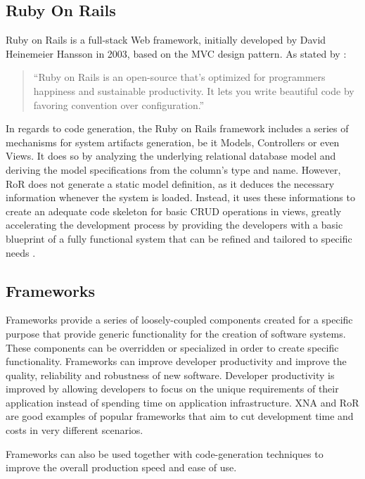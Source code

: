 \subsection{Ruby On Rails}\label{sec:ror}

Ruby on Rails is a full-stack Web framework, initially developed by David Heinemeier Hansson in 2003, based on the MVC design pattern. As stated by \cite{rubyonrails}:

\begin{quote}
  ``Ruby on Rails is an open-source that's optimized for programmers happiness and sustainable productivity. It lets you write beautiful code by favoring convention over configuration.''
\end{quote}

In regards to code generation, the Ruby on Rails framework includes a series of mechanisms for system artifacts generation, be it Models, Controllers or even Views. It does so by analyzing the underlying relational database model and deriving the model specifications from the column's type and name. However, RoR does not generate a static model definition, as it deduces the necessary information whenever the system is loaded. Instead, it uses these informations to create an adequate code skeleton for basic CRUD operations in views, greatly accelerating the development process by providing the developers with a basic blueprint of a fully functional system that can be refined and tailored to specific needs \cite{rails_generators}.

\subsection{Frameworks}\label{sec:frameworks}

Frameworks provide a series of loosely-coupled components created for a specific purpose that provide generic functionality for the creation of software systems. These components can be overridden or specialized in order to create specific functionality. Frameworks can improve developer productivity and improve the quality, reliability and robustness of new software.  Developer productivity is improved by allowing developers to focus on the unique requirements of their application instead of spending time on application infrastructure. XNA \cite{xna} and RoR \cite{rubyonrails} are good examples of popular frameworks that aim to cut development time and costs in very different scenarios.

Frameworks can also be used together with code-generation techniques \cite{DH04, rails_generators} to improve the overall production speed and ease of use.

